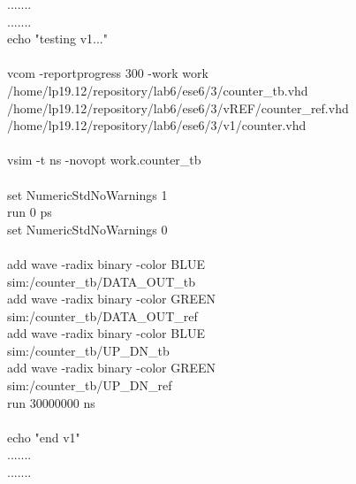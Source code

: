 .......\\
.......\\
echo "testing v1..."\\
\\
vcom -reportprogress 300 -work work\\ /home/lp19.12/repository/lab6/ese6/3/counter\_tb.vhd\\ /home/lp19.12/repository/lab6/ese6/3/vREF/counter\_ref.vhd\\ /home/lp19.12/repository/lab6/ese6/3/v1/counter.vhd\\
\\
vsim -t ns -novopt work.counter\_tb\\
\\
set NumericStdNoWarnings 1\\
run 0 ps\\
set NumericStdNoWarnings 0\\
\\
add wave -radix binary   -color BLUE\\      sim:/counter\_tb/DATA\_OUT\_tb\\
add wave -radix binary   -color GREEN\\    sim:/counter\_tb/DATA\_OUT\_ref\\
add wave -radix binary   -color BLUE\\     sim:/counter\_tb/UP\_DN\_tb\\
add wave -radix binary   -color GREEN \\   sim:/counter\_tb/UP\_DN\_ref\\
run 30000000 ns\\
\\
echo "end v1"\\
.......\\
.......\\
\\


